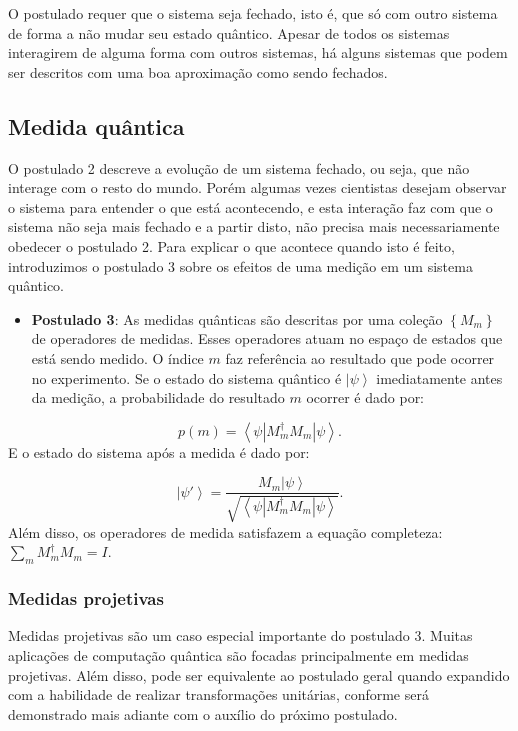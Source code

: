O postulado requer que o sistema seja fechado, isto é, que só com outro sistema de forma a não mudar seu estado quântico. Apesar de todos os sistemas interagirem de alguma forma com outros sistemas, há alguns sistemas que podem ser descritos com uma boa aproximação como sendo fechados. 

\subsection{Medida quântica}
O postulado 2 descreve a evolução de um sistema fechado, ou seja, que não interage com o resto do mundo. Porém algumas vezes cientistas  desejam observar o sistema para entender o que está acontecendo, e esta interação faz com que o sistema não seja mais fechado e a partir disto, não precisa mais necessariamente obedecer o postulado 2. Para explicar o que acontece quando isto é feito, introduzimos o postulado 3 sobre os efeitos de uma medição em um sistema quântico.

\begin{itemize}
\item \textbf{Postulado 3}: As medidas quânticas são descritas por uma coleção $\left\{ M_{m}\right\} $ de operadores de medidas. Esses operadores atuam no espaço de estados que está sendo medido. O índice $m$ faz referência ao resultado que pode ocorrer no experimento. Se o estado do sistema quântico é $\left|\psi\right\rangle $ imediatamente antes da medição, a probabilidade do resultado $m$ ocorrer é dado por:
\end{itemize}
\begin{equation}
p\left(m\right)=\left\langle \psi\left|M_{m}^{\dagger}M_{m}\right|\psi\right\rangle 
. \end{equation}
E o estado do sistema após a medida é dado por:

\begin{equation}
\left|\psi'\right\rangle =\frac{M_{m}\left|\psi\right\rangle }{\sqrt{\left\langle \psi\left|M_{m}^{\dagger}M_{m}\right|\psi\right\rangle }}
. \end{equation}
Além disso, os operadores de medida satisfazem a equação completeza: $ \sum_{m}M_{m}^{\dagger}M_{m}=I.$

\subsubsection{Medidas projetivas}
Medidas projetivas são um caso especial importante do postulado 3.  Muitas aplicações de computação quântica são focadas principalmente em medidas projetivas. Além disso, pode ser equivalente ao postulado geral quando expandido com a habilidade de realizar transformações unitárias, conforme será demonstrado mais adiante com o auxílio do próximo postulado. 

